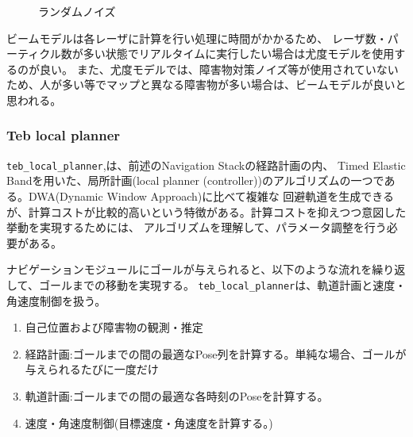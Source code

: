 \begin{enumerate}
    \begin{figure}[h]
      \begin{center}
      \caption{ランダムノイズ}
      \label{auto:navstack:gauss_yudo_rand}
      \end{center}
    \end{figure}

    ビームモデルは各レーザに計算を行い処理に時間がかかるため、
    レーザ数・パーティクル数が多い状態でリアルタイムに実行したい場合は尤度モデルを使用するのが良い。
    また、尤度モデルでは、障害物対策ノイズ等が使用されていないため、人が多い等でマップと異なる障害物が多い場合は、ビームモデルが良いと思われる。
  \end{enumerate}

\subsubsection{Teb local planner}
\verb|teb_local_planner|\cite{auto:teb1},\cite{auto:teb2}は、前述のNavigation Stackの経路計画の内、
Timed Elastic Bandを用いた、局所計画(local planner (controller))のアルゴリズムの一つである。DWA(Dynamic Window Approach)に比べて複雑な
回避軌道を生成できるが、計算コストが比較的高いという特徴がある。計算コストを抑えつつ意図した挙動を実現するためには、
アルゴリズムを理解して、パラメータ調整を行う必要がある。

ナビゲーションモジュールにゴールが与えられると、以下のような流れを繰り返して、ゴールまでの移動を実現する。
\verb|teb_local_planner|は、軌道計画と速度・角速度制御を扱う。
\begin{enumerate}
  \item 自己位置および障害物の観測・推定
  \item 経路計画:ゴールまでの間の最適なPose列を計算する。単純な場合、ゴールが与えられるたびに一度だけ
  \item 軌道計画:ゴールまでの間の最適な各時刻のPoseを計算する。
  \item 速度・角速度制御(目標速度・角速度を計算する。)
\end{enumerate}

